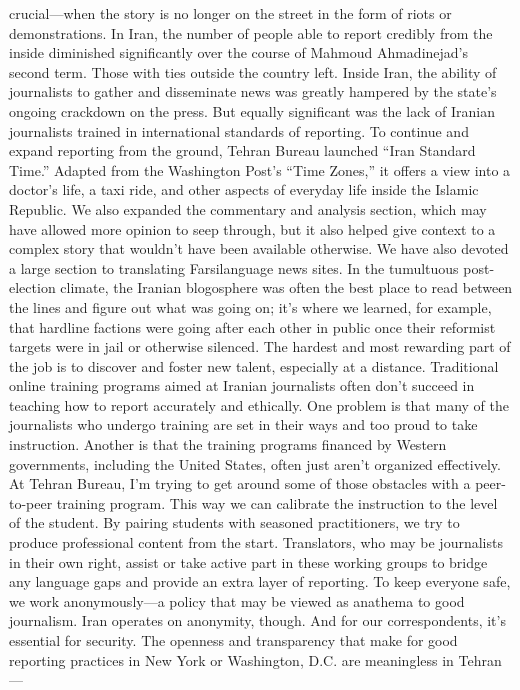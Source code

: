 crucial—when the story is no longer on the street in the form of riots or demonstrations.
In Iran, the number of people able to report credibly from the inside diminished
significantly over the course of Mahmoud Ahmadinejad’s second term. Those with ties
outside the country left. Inside Iran, the ability of journalists to gather and disseminate
news was greatly hampered by the state’s ongoing crackdown on the press. But equally
significant was the lack of Iranian journalists trained in international standards of
reporting.
To continue and expand reporting from the ground, Tehran Bureau launched ``Iran
Standard Time.'' Adapted from the Washington Post’s ``Time Zones,'' it offers a view into
a doctor’s life, a taxi ride, and other aspects of everyday life inside the Islamic Republic.
We also expanded the commentary and analysis section, which may have allowed more
opinion to seep through, but it also helped give context to a complex story that wouldn’t
have been available otherwise. We have also devoted a large section to translating Farsilanguage
news sites. In the tumultuous post-election climate, the Iranian blogosphere was
often the best place to read between the lines and figure out what was going on; it’s
where we learned, for example, that hardline factions were going after each other in
public once their reformist targets were in jail or otherwise silenced.
The hardest and most rewarding part of the job is to discover and foster new talent,
especially at a distance. Traditional online training programs aimed at Iranian journalists
often don’t succeed in teaching how to report accurately and ethically. One problem is
that many of the journalists who undergo training are set in their ways and too proud to
take instruction. Another is that the training programs financed by Western governments,
including the United States, often just aren’t organized effectively.
At Tehran Bureau, I’m trying to get around some of those obstacles with a peer-to-peer
training program. This way we can calibrate the instruction to the level of the student. By
pairing students with seasoned practitioners, we try to produce professional content from
the start. Translators, who may be journalists in their own right, assist or take active part
in these working groups to bridge any language gaps and provide an extra layer of
reporting.
To keep everyone safe, we work anonymously—a policy that may be viewed as
anathema to good journalism. Iran operates on anonymity, though. And for our
correspondents, it’s essential for security. The openness and transparency that make for
good reporting practices in New York or Washington, D.C. are meaningless in Tehran—
